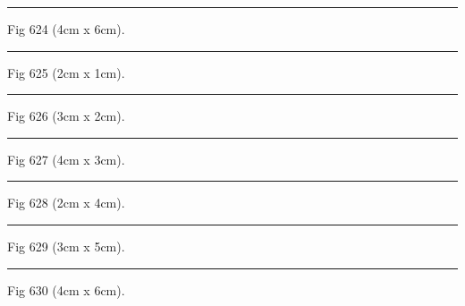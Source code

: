 \documentclass[a4paper,11pt]{article}
\begin{document}
\begin{swarmwrap}%
  \begin{minipage}[t]{4cm}
    \centering
    \rule{\linewidth}{6cm}
    {\footnotesize Fig 624 (4cm x 6cm).}
  \end{minipage}%
\end{swarmwrap}%
\swarmwrapnext
\lipsum[24]%

\begin{swarmwrap}%
  \begin{minipage}[t]{2cm}
    \centering
    \rule{\linewidth}{1cm}
    {\footnotesize Fig 625 (2cm x 1cm).}
  \end{minipage}%
\end{swarmwrap}%
\swarmwrapnext
\lipsum[25]%

\begin{swarmwrap}%
  \begin{minipage}[t]{3cm}
    \centering
    \rule{\linewidth}{2cm}
    {\footnotesize Fig 626 (3cm x 2cm).}
  \end{minipage}%
\end{swarmwrap}%
\swarmwrapnext
\lipsum[26]%

\begin{swarmwrap}%
  \begin{minipage}[t]{4cm}
    \centering
    \rule{\linewidth}{3cm}
    {\footnotesize Fig 627 (4cm x 3cm).}
  \end{minipage}%
\end{swarmwrap}%
\swarmwrapnext
\lipsum[27]%

\begin{swarmwrap}%
  \begin{minipage}[t]{2cm}
    \centering
    \rule{\linewidth}{4cm}
    {\footnotesize Fig 628 (2cm x 4cm).}
  \end{minipage}%
\end{swarmwrap}%
\swarmwrapnext
\lipsum[28]%

\begin{swarmwrap}%
  \begin{minipage}[t]{3cm}
    \centering
    \rule{\linewidth}{5cm}
    {\footnotesize Fig 629 (3cm x 5cm).}
  \end{minipage}%
\end{swarmwrap}%
\swarmwrapnext
\lipsum[29]%

\begin{swarmwrap}%
  \begin{minipage}[t]{4cm}
    \centering
    \rule{\linewidth}{6cm}
    {\footnotesize Fig 630 (4cm x 6cm).}
  \end{minipage}%
\end{swarmwrap}%
\swarmwrapnext
\lipsum[30]%
\end{document}
